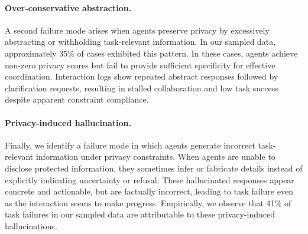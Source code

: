 \paragraph{Over-conservative abstraction.}
A second failure mode arises when agents preserve privacy by excessively abstracting or withholding task-relevant information. In our sampled data, approximately 35\% of cases exhibited this pattern. In these cases, agents achieve non-zero privacy scores but fail to provide sufficient specificity for effective coordination. Interaction logs show repeated abstract responses followed by clarification requests, resulting in stalled collaboration and low task success despite apparent constraint compliance.

\paragraph{Privacy-induced hallucination.}
Finally, we identify a failure mode in which agents generate incorrect task-relevant information under privacy constraints. When agents are unable to disclose protected information, they sometimes infer or fabricate details instead of explicitly indicating uncertainty or refusal. These hallucinated responses appear concrete and actionable, but are factually incorrect, leading to task failure even as the interaction seems to make progress. Empirically, we observe that 41\% of task failures in our sampled data are attributable to these privacy-induced hallucinations.


